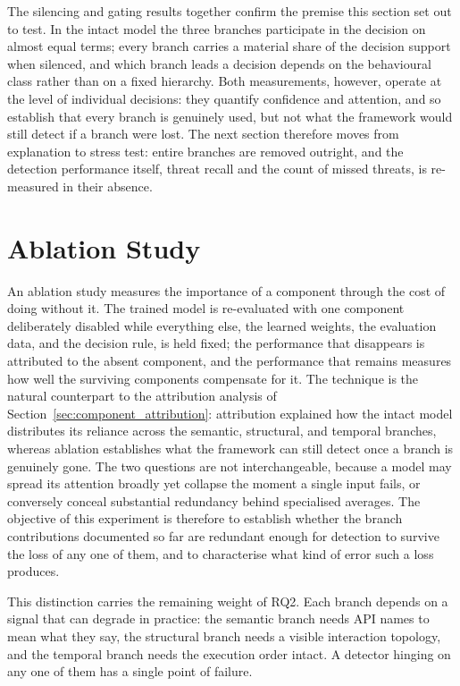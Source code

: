 \documentclass[%
    BCOR=10mm,
    DIV=13,
    toc=bibliography,
    toc=listof,
    oneside,
    12pt,
]{scrbook}
\begin{document}
The silencing and gating results together confirm the premise this section set
out to test. In the intact model the three branches participate in the decision
on almost equal terms;
every branch carries a material share of the decision support when silenced,
and which branch leads a decision depends on the behavioural class rather than
on a fixed hierarchy. Both measurements, however, operate at the level of
individual decisions: they quantify confidence and attention, and so establish
that every branch is genuinely used, but not what the framework would still
detect if a branch were lost. The next section therefore moves from explanation
to stress test: entire branches are removed outright, and the detection
performance itself, threat recall and the count of missed threats, is
re-measured in their absence.


\section{Ablation Study}
\label{sec:ablation_results}

An ablation study measures the importance of a component through the cost of
doing without it. The trained model is re-evaluated with one component
deliberately disabled while everything else, the learned weights, the
evaluation data, and
the decision rule, is held fixed; the performance that disappears is
attributed to the absent component, and the performance that remains measures
how well the surviving components compensate for it. The technique is the
natural counterpart to the attribution analysis of
Section~\ref{sec:component_attribution}: attribution explained how the intact
model distributes its reliance across the semantic, structural, and temporal
branches, whereas ablation establishes what the framework can still detect
once a branch is genuinely gone. The two questions are not interchangeable,
because a model may spread its attention broadly yet collapse the moment a
single input fails, or conversely conceal substantial redundancy behind
specialised averages. The objective of this experiment is therefore to
establish whether the branch contributions documented so far are redundant
enough for detection to survive the loss of any one of them, and to
characterise what kind of error such a loss produces.

This distinction carries the remaining weight of RQ2. Each branch depends on
a signal that can degrade in practice: the semantic branch needs API names to
mean what they say, the structural branch needs a visible interaction topology,
and the temporal branch needs the execution order intact. A detector hinging
on any one of them has a single point of failure.
\end{document}
